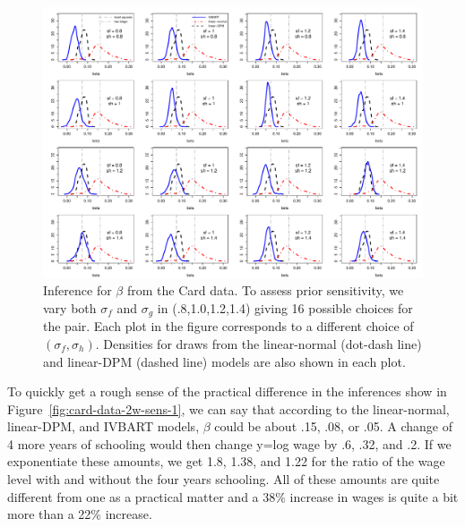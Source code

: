 \begin{figure}
\centerline{\includegraphics[scale=.5]{card-ivbart-2w-sens-4.pdf}}
\caption{%
Inference for $\beta$ from the Card data.
To assess prior sensitivity, we vary both $\sigma_f$ and $\sigma_g$ in (.8,1.0,1.2,1.4) giving 16 possible choices for the pair.
Each plot in the figure corresponds to a different choice of $(\sigma_f,\sigma_h)$.
Densities for draws from the linear-normal (dot-dash line) and linear-DPM (dashed line) models are
also shown in each plot.
\label{fig:card-data-2w-sens-4}}
\end{figure}



To quickly get a rough sense of the practical difference in the inferences show in Figure~\ref{fig:card-data-2w-sens-1},
we can say that according to the linear-normal, linear-DPM, and IVBART models, $\beta$ could be about .15, .08, or .05.
A change of 4 more years of schooling would then change y=log wage by .6, .32, and .2.
If we exponentiate these amounts, we get 1.8, 1.38, and 1.22 for the ratio of the wage level with and without the four years schooling.
All of these amounts are quite different from one as a practical matter and a 38\% increase in wages is quite a bit more than a 22\% increase.




